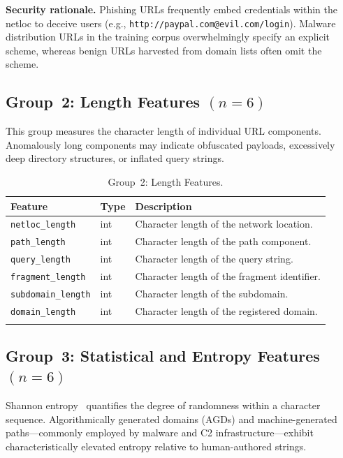 \documentclass[a4paper,12pt]{article}
\begin{document}
\textbf{Security rationale.} Phishing URLs frequently embed credentials within the netloc to deceive users (e.g., \texttt{http://paypal.com@evil.com/login}). Malware distribution URLs in the training corpus overwhelmingly specify an explicit scheme, whereas benign URLs harvested from domain lists often omit the scheme.

\subsection{Group~2: Length Features \texorpdfstring{$(n=6)$}{(n=6)}}
\label{sec:feat_length}

This group measures the character length of individual URL components. Anomalously long components may indicate obfuscated payloads, excessively deep directory structures, or inflated query strings.

\begin{longtable}{p{4.5cm}p{1.5cm}p{7cm}}
\toprule
\textbf{Feature} & \textbf{Type} & \textbf{Description} \\
\midrule
\endhead
\texttt{netloc\_length}     & int & Character length of the network location. \\
\texttt{path\_length}       & int & Character length of the path component. \\
\texttt{query\_length}      & int & Character length of the query string. \\
\texttt{fragment\_length}   & int & Character length of the fragment identifier. \\
\texttt{subdomain\_length}  & int & Character length of the subdomain. \\
\texttt{domain\_length}     & int & Character length of the registered domain. \\
\bottomrule
\caption{Group~2: Length Features.}
\label{tab:length}
\end{longtable}

\subsection{Group~3: Statistical and Entropy Features \texorpdfstring{$(n=6)$}{(n=6)}}
\label{sec:feat_entropy}

Shannon entropy~\cite{shannon} quantifies the degree of randomness within a character sequence. Algorithmically generated domains (AGDs) and machine-generated paths---commonly employed by malware and C2 infrastructure---exhibit characteristically elevated entropy relative to human-authored strings.
\end{document}
